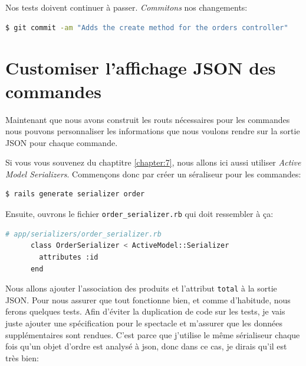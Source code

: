\documentclass[]{report}
\begin{document}
      Nos tests doivent continuer à passer. \textit{Commitons} nos changements:

      \begin{scriptsize}
        \begin{lstlisting}[language=bash]
        $ git commit -am "Adds the create method for the orders controller"
        \end{lstlisting}
      \end{scriptsize}

  \section{Customiser l'affichage JSON des commandes}

    Maintenant que nous avons construit les routs nécessaires pour les commandes nous pouvons personnaliser les informations que nous voulons rendre sur la sortie JSON pour chaque commande.

    Si vous vous souvenez du chaptitre \ref{chapter:7}, nous allons ici aussi utiliser \textit{Active Model Serializers}. Commençons donc par créer un séraliseur pour les commandes:

    \begin{scriptsize}
      \begin{lstlisting}[language=bash]
      $ rails generate serializer order
      \end{lstlisting}
    \end{scriptsize}

    Ensuite, ouvrons le fichier \verb|order_serializer.rb| qui doit ressembler à ça:

    \begin{scriptsize}
      \begin{lstlisting}[language=bash]
      # app/serializers/order_serializer.rb
      class OrderSerializer < ActiveModel::Serializer
        attributes :id
      end
      \end{lstlisting}
    \end{scriptsize}


    Nous allons ajouter l'association des produits et l'attribut \verb|total| à la sortie JSON. Pour nous assurer que tout fonctionne bien, et comme d'habitude, nous ferons quelques tests. Afin d'éviter la duplication de code sur les tests, je vais juste ajouter une spécification pour le spectacle et m'assurer que les données supplémentaires sont rendues. C'est parce que j'utilise le même sérialiseur chaque fois qu'un objet d'ordre est analysé à json, donc dans ce cas, je dirais qu'il est très bien:
\end{document}

